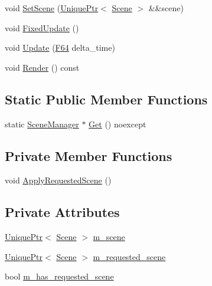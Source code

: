 \begin{DoxyCompactItemize}
void \hyperlink{classmage_1_1_scene_manager_abd9572b72caa412eda1f6c4e5d771fc3}{Set\+Scene} (\hyperlink{namespacemage_a3316d7143a973e37adf1110f2e80ca31}{Unique\+Ptr}$<$ \hyperlink{classmage_1_1_scene}{Scene} $>$ \&\&scene)
\item 
void \hyperlink{classmage_1_1_scene_manager_a6d97c0fb7945aeb53ec950e62567c1f4}{Fixed\+Update} ()
\item 
void \hyperlink{classmage_1_1_scene_manager_a10c718ddfca8caa4bdc6f1cbf1daf12f}{Update} (\hyperlink{namespacemage_ad26233bbec640deda836e572c1a23708}{F64} delta\+\_\+time)
\item 
void \hyperlink{classmage_1_1_scene_manager_a05c854e957e3f78e243efe3e422955a6}{Render} () const
\end{DoxyCompactItemize}
\subsection*{Static Public Member Functions}
\begin{DoxyCompactItemize}
\item 
static \hyperlink{classmage_1_1_scene_manager}{Scene\+Manager} $\ast$ \hyperlink{classmage_1_1_scene_manager_a282dbbea100d7de48c0b0876619db5e7}{Get} () noexcept
\end{DoxyCompactItemize}
\subsection*{Private Member Functions}
\begin{DoxyCompactItemize}
\item 
void \hyperlink{classmage_1_1_scene_manager_adadc65dc4bd9643c1befd261903309f7}{Apply\+Requested\+Scene} ()
\end{DoxyCompactItemize}
\subsection*{Private Attributes}
\begin{DoxyCompactItemize}
\item 
\hyperlink{namespacemage_a3316d7143a973e37adf1110f2e80ca31}{Unique\+Ptr}$<$ \hyperlink{classmage_1_1_scene}{Scene} $>$ \hyperlink{classmage_1_1_scene_manager_a774c610dba3ece25acf97915b6368a1a}{m\+\_\+scene}
\item 
\hyperlink{namespacemage_a3316d7143a973e37adf1110f2e80ca31}{Unique\+Ptr}$<$ \hyperlink{classmage_1_1_scene}{Scene} $>$ \hyperlink{classmage_1_1_scene_manager_a74bdb7b0805208b039991e9b9abc741f}{m\+\_\+requested\+\_\+scene}
\item 
bool \hyperlink{classmage_1_1_scene_manager_aff9889d9fc53a3524b0e88d10cd544d6}{m\+\_\+has\+\_\+requested\+\_\+scene}
\end{DoxyCompactItemize}


